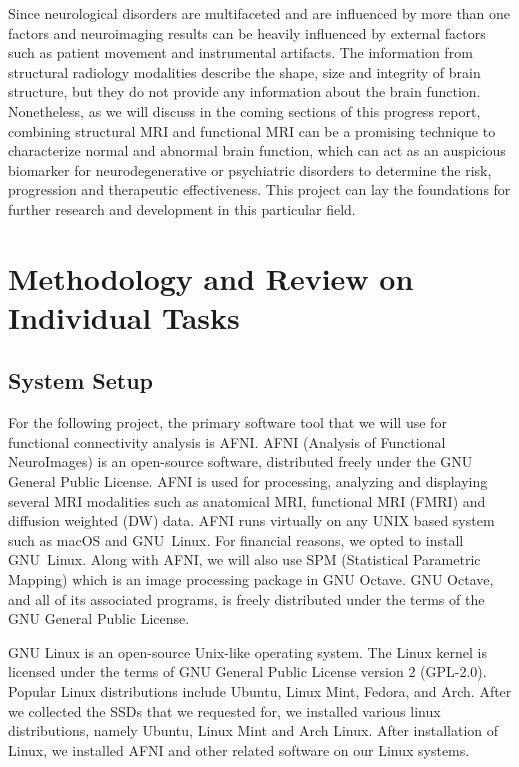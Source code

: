 \documentclass[12pt]{article}
\begin{document}
Since neurological disorders are multifaceted and are influenced by
more than one factors and neuroimaging results can be heavily
influenced by external factors such as patient movement and
instrumental artifacts.  The information from structural radiology
modalities describe the shape, size and integrity of brain structure,
but they do not provide any information about the brain function.
Nonetheless, as we will discuss in the coming sections of this
progress report, combining structural MRI and functional MRI can be a
promising technique to characterize normal and abnormal brain
function, which can act as an auspicious biomarker for
neurodegenerative or psychiatric disorders to determine the risk,
progression and therapeutic effectiveness. This project can lay the
foundations for further research and development in this particular
field.

\newpage
\section{Methodology and Review on Individual Tasks}

\subsection{System Setup}%
\label{sub:system_setup}

For the following project, the primary software tool that we will use
for functional connectivity analysis is AFNI. AFNI (Analysis of
Functional NeuroImages) is an open-source software, distributed
freely under the GNU General Public License.  AFNI is used for
processing, analyzing and displaying several MRI modalities such as
anatomical MRI, functional MRI (FMRI) and diffusion weighted (DW)
data. AFNI runs virtually on any UNIX based system such as macOS and
GNU~Linux. For financial reasons, we opted to install GNU~Linux. Along
with AFNI, we will also use SPM (Statistical Parametric Mapping) which
is an image processing package in GNU Octave. GNU Octave, and all of
its associated programs, is freely distributed under the terms of the
GNU General Public License.

GNU Linux is an open-source Unix-like operating system. The Linux
kernel is licensed under the terms of GNU General Public License
version 2 (GPL-2.0). Popular Linux distributions include Ubuntu,
Linux Mint, Fedora, and Arch. After we collected the SSDs that we
requested for, we installed various linux distributions, namely
Ubuntu, Linux Mint and Arch Linux. After installation of Linux, we
installed AFNI and other related software on our Linux systems.
\end{document}
